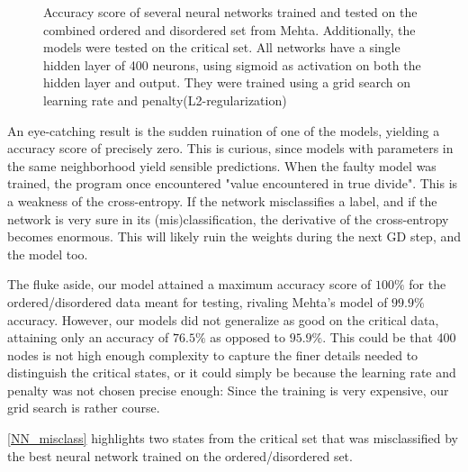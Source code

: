 \begin{figure}[H]
\caption{Accuracy score of several neural networks trained and tested on the combined ordered and disordered set from Mehta. Additionally, the models were tested on the critical set. All networks have a single hidden layer of 400 neurons, using sigmoid as activation on both the hidden layer and output. They were trained using a grid search on learning rate and penalty(L2-regularization)}
\label{fig:NN_class}
\end{figure}

An eye-catching result is the sudden ruination of one of the models, yielding a accuracy score of precisely zero. This is curious, since models with parameters in the same neighborhood yield sensible predictions. When the faulty model was trained, the program once encountered "value encountered in true divide". This is a weakness of the cross-entropy. If the network misclassifies a label, and if the network is very sure in its (mis)classification, the derivative of the cross-entropy becomes enormous. This will likely ruin the weights during the next GD step, and the model too.

The fluke aside, our model attained a maximum accuracy score of $100\%$ for the ordered/disordered data meant for testing, rivaling Mehta's model of $99.9\%$ accuracy. However, our models did not generalize as good on the critical data, attaining only an accuracy of $76.5\%$ as opposed to $95.9\%$. This could be that 400 nodes is not high enough complexity to capture the finer details needed to distinguish the critical states, or it could simply be because the learning rate and penalty was not chosen precise enough: Since the training is very expensive, our grid search is rather course.

\autoref{NN_misclass} highlights two states from the critical set that was misclassified by the best neural network trained on the ordered/disordered set.

